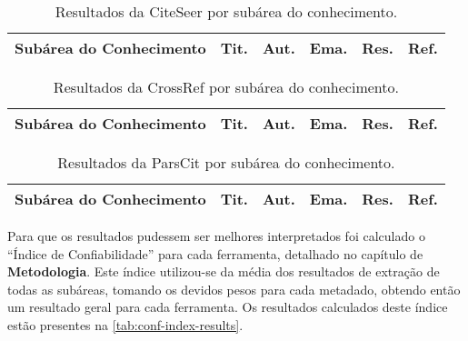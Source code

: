 \begin{table}
    \caption{Resultados da CiteSeer por subárea do conhecimento.}
    \begin{center}
        \begin{tabular}{|p{6cm}|C{1.2cm}|C{1.2cm}|C{1.2cm}|C{1.2cm}|C{1.2cm}|}
            \hline 
            \textbf{Subárea do Conhecimento} & \textbf{Tit.} & \textbf{Aut.} & \textbf{Ema.} & \textbf{Res.} & \textbf{Ref.} \\ \hline 
            
        \end{tabular}
    \end{center}
    \label{tab:results-citeseer}
\end{table}

\begin{table}
    \caption{Resultados da CrossRef por subárea do conhecimento.}
    \begin{center}
        \begin{tabular}{|p{6cm}|C{1.2cm}|C{1.2cm}|C{1.2cm}|C{1.2cm}|C{1.2cm}|}
            \hline 
            \textbf{Subárea do Conhecimento} & \textbf{Tit.} & \textbf{Aut.} & \textbf{Ema.} & \textbf{Res.} & \textbf{Ref.} \\ \hline 
            
        \end{tabular}
    \end{center}
    \label{tab:results-crossref}
\end{table}

\begin{table}
    \caption{Resultados da ParsCit por subárea do conhecimento.}
    \begin{center}
        \begin{tabular}{|p{6cm}|C{1.2cm}|C{1.2cm}|C{1.2cm}|C{1.2cm}|C{1.2cm}|}
            \hline 
            \textbf{Subárea do Conhecimento} & \textbf{Tit.} & \textbf{Aut.} & \textbf{Ema.} & \textbf{Res.} & \textbf{Ref.} \\ \hline 
            
        \end{tabular}
    \end{center}
    \label{tab:results-parscit}
\end{table}


Para que os resultados pudessem ser melhores interpretados foi calculado o ``Índice de Confiabilidade'' para cada ferramenta, detalhado no capítulo de \textbf{Metodologia}. Este índice utilizou-se da média dos resultados de extração de todas as subáreas, tomando os devidos pesos para cada metadado, obtendo então um resultado geral para cada ferramenta. Os resultados calculados deste índice estão presentes na \autoref{tab:conf-index-results}.

